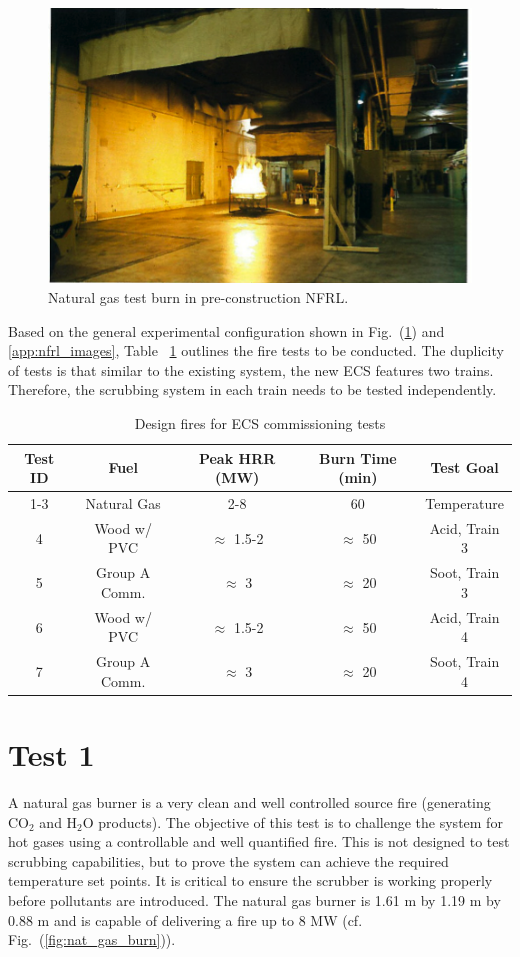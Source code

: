 \documentclass[12pt,oneside]{book}
\begin{document}
\begin{figure}
\includegraphics[width=\textwidth]{../Figures/NFRL_Fire}
\caption {Natural gas test burn in pre-construction NFRL.}
\label{fig:NFRL_fire}
\end{figure}

Based on the general experimental configuration shown in Fig.~(\ref{fig:NFRL_fire}) and \ref{app:nfrl_images}, Table ~\ref{tab:fires} outlines the fire tests to be conducted. The duplicity of tests is that similar to the existing system, the new ECS features two trains. Therefore, the scrubbing system in each train needs to be tested independently. 

\begin{table}
\centering
\caption{Design fires for ECS commissioning tests}
\label{tab:fires}
\begin{tabular}{ccccc}
\toprule[1.5pt]
Test ID & Fuel & Peak HRR (MW) & Burn Time (min) & Test Goal  \\
\midrule
1-3  & Natural Gas  & 2-8   & 60  & Temperature  \\
4  & Wood w/ PVC  & $\approx$ 1.5-2 & $\approx$ 50  & Acid, Train 3 \\
5  & Group A Comm. & $\approx$ 3 & $\approx$ 20  & Soot, Train 3 \\
6  & Wood w/ PVC  & $\approx$ 1.5-2 & $\approx$ 50  & Acid, Train 4 \\
7  & Group A Comm. & $\approx$ 3 & $\approx$ 20  & Soot, Train 4 \\
\bottomrule[1.25pt]
\end{tabular}\par
\end{table}


\section{Test 1}
\label{test1}
A natural gas burner is a very clean and well controlled source fire (generating CO$_2$ and H$_2$O products). The objective of this test is to challenge the system for hot gases using a controllable and well quantified fire. This is not designed to test scrubbing capabilities, but to prove the system can achieve the required temperature set points. It is critical to ensure the scrubber is working properly before pollutants are introduced. The natural gas burner is 1.61 m by 1.19 m by 0.88 m and is capable of delivering a fire up to 8 MW (cf. Fig.~(\ref{fig:nat_gas_burn})).
\end{document}
